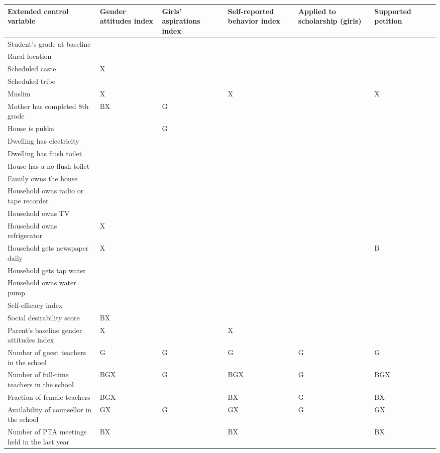 \def\sym#1{\ifmmode^{#1}\else\(^{#1}\)\fi}  \begin{tabular}{@{\extracolsep{1pt}}p{7.8cm}*{6}{>{\centering\arraybackslash}m{2cm}}@{}}   \toprule
  Extended control variable & Gender attitudes index &  Girls' aspirations index & Self-reported behavior index & Applied to scholarship (girls)  & Supported petition     \\   
\midrule
Student's grade at baseline &  &  &  &  &  \\ 
Rural location &  &  &  &  &  \\ 
Scheduled caste & X &  &  &  &  \\ 
Scheduled tribe &  &  &  &  &  \\ 
Muslim & X &  & X &  & X \\ 
Mother has completed 8th grade & BX & G &  &  &  \\ 
House is pukka &  & G &  &  &  \\ 
Dwelling has electricity &  &  &  &  &  \\ 
Dwelling has flush toilet &  &  &  &  &  \\ 
House has a no-flush toilet &  &  &  &  &  \\ 
Family owns the house &  &  &  &  &  \\ 
Household owns radio or tape recorder &  &  &  &  &  \\ 
Household owns TV &  &  &  &  &  \\ 
Household owns refrigerator & X &  &  &  &  \\ 
Household gets newspaper daily & X &  &  &  & B \\ 
Household gets tap water &  &  &  &  &  \\ 
Household owns water pump &  &  &  &  &  \\ 
Self-efficacy index &  &  &  &  &  \\ 
Social desirability score & BX &  &  &  &  \\ 
Parent's baseline gender attitudes index & X &  & X &  &  \\ 
Number of guest teachers in the school & G & G & G & G & G \\ 
Number of full-time teachers in the school & BGX & G & BGX & G & BGX \\ 
Fraction of female teachers & BGX &  & BX & G & BX \\ 
Availability of counsellor in the school & GX & G & GX & G & GX \\ 
Number of PTA meetings held in the last year & BX &  & BX &  & BX \\ 

\end{tabular}
